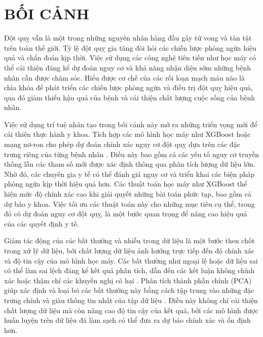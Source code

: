 \chapter{BỐI CẢNH}
Đột quỵ vẫn là một trong những nguyên nhân hàng đầu gây tử vong và tàn tật trên toàn thế giới. Tỷ lệ đột quỵ gia tăng đòi hỏi các chiến lược phòng ngừa hiệu quả và chẩn đoán kịp thời. Việc sử dụng các công nghệ tiên tiến như học máy  có thể cải thiện đáng kể dự đoán nguy cơ và khả năng nhận diện sớm những bệnh nhân cần được chăm sóc. Hiểu được cơ chế của các rối loạn mạch máu não là chìa khóa để phát triển các chiến lược phòng ngừa và điều trị đột quỵ hiệu quả, qua đó giảm thiểu hậu quả của bệnh và cải thiện chất lượng cuộc sống của bệnh nhân.

Việc sử dụng trí tuệ nhân tạo trong bối cảnh này mở ra những triển vọng mới để cải thiện thực hành y khoa. Tích hợp các mô hình học máy như XGBoost hoặc mạng nơ-ron cho phép dự đoán chính xác nguy cơ đột quỵ dựa trên các đặc trưng riêng của từng bệnh nhân . Điều này bao gồm cả các yếu tố nguy cơ truyền thống lẫn các tham số mới được xác định thông qua phân tích lượng dữ liệu lớn. Nhờ đó, các chuyên gia y tế có thể đánh giá nguy cơ và triển khai các biện pháp phòng ngừa kịp thời hiệu quả hơn. Các thuật toán học máy như XGBoost thể hiện mức độ chính xác cao khi giải quyết những bài toán phức tạp, bao gồm cả dự báo y khoa. Việc tối ưu các thuật toán này cho những mục tiêu cụ thể, trong đó có dự đoán nguy cơ đột quỵ, là một bước quan trọng để nâng cao hiệu quả của các quyết định y tế.

Giảm tác động của các bất thường và nhiễu trong dữ liệu là một bước then chốt trong xử lý dữ liệu, bởi chất lượng dữ liệu ảnh hưởng trực tiếp đến độ chính xác và độ tin cậy của mô hình học máy. Các bất thường như ngoại lệ hoặc dữ liệu sai có thể làm sai lệch đáng kể kết quả phân tích, dẫn đến các kết luận không chính xác hoặc thậm chí các khuyến nghị có hại . Phân tích thành phần chính (PCA) giúp xác định và loại bỏ các bất thường này bằng cách tập trung vào những đặc trưng chính và giàu thông tin nhất của tập dữ liệu . Điều này không chỉ cải thiện chất lượng dữ liệu mà còn nâng cao độ tin cậy của kết quả, bởi các mô hình được huấn luyện trên dữ liệu đã làm sạch có thể đưa ra dự báo chính xác và ổn định hơn.

